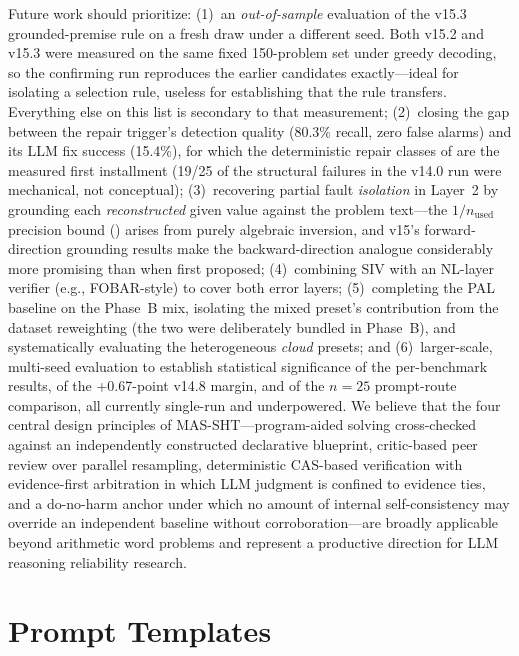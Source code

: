 \documentclass[11pt,a4paper]{article}
\begin{document}
Future work should prioritize: (1)~an \emph{out-of-sample} evaluation of the v15.3 grounded-premise rule on a fresh draw under a different seed. Both v15.2 and v15.3 were measured on the same fixed 150-problem set under greedy decoding, so the confirming run reproduces the earlier candidates exactly---ideal for isolating a selection rule, useless for establishing that the rule transfers. Everything else on this list is secondary to that measurement; (2)~closing the gap between the repair trigger's detection quality (80.3\% recall, zero false alarms) and its LLM fix success (15.4\%), for which the deterministic repair classes of  are the measured first installment (19/25 of the structural failures in the v14.0 run were mechanical, not conceptual); (3)~recovering partial fault \emph{isolation} in Layer~2 by grounding each \emph{reconstructed} given value against the problem text---the $1/n_{\text{used}}$ precision bound () arises from purely algebraic inversion, and v15's forward-direction grounding results make the backward-direction analogue considerably more promising than when first proposed; (4)~combining SIV with an NL-layer verifier (e.g., FOBAR-style) to cover both error layers; (5)~completing the PAL baseline on the Phase~B mix, isolating the mixed preset's contribution from the dataset reweighting (the two were deliberately bundled in Phase~B), and systematically evaluating the heterogeneous \emph{cloud} presets; and (6)~larger-scale, multi-seed evaluation to establish statistical significance of the per-benchmark results, of the +0.67-point v14.8 margin, and of the $n{=}25$ prompt-route comparison, all currently single-run and underpowered.
We believe that the four central design principles of MAS-SHT---program-aided solving cross-checked against an independently constructed declarative blueprint, critic-based peer review over parallel resampling, deterministic CAS-based verification with evidence-first arbitration in which LLM judgment is confined to evidence ties, and a do-no-harm anchor under which no amount of internal self-consistency may override an independent baseline without corroboration---are broadly applicable beyond arithmetic word problems and represent a productive direction for LLM reasoning reliability research.
\newpage

\appendix
\newpage
\section{Prompt Templates}
\label{app:prompts}
\end{document}
